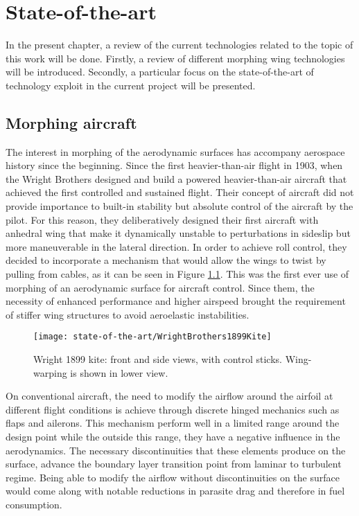 \chapter{State-of-the-art} \label{chap:State_of_the_art}

In the present chapter, a review of the current technologies related to the topic of this work will be done. Firstly, a review of different morphing wing technologies will be introduced. Secondly, a particular focus on the state-of-the-art of technology exploit in the current project will be presented.

\section{Morphing aircraft} \label{sec:Morphing_state}

  The interest in morphing of the aerodynamic surfaces has accompany aerospace history since the beginning. Since the first heavier-than-air flight in 1903, when the Wright Brothers designed and build a powered heavier-than-air aircraft that achieved the  first controlled and sustained flight. Their concept of aircraft did not provide importance to built-in stability but absolute control of the aircraft by the pilot. For this reason, they deliberatively designed their first aircraft with anhedral wing that make it dynamically unstable to perturbations in sideslip but more maneuverable in the lateral direction. In order to achieve roll control, they decided to incorporate a mechanism that would allow the wings to twist by pulling from cables, as it can be seen in Figure \ref{fig:Wright}. This was the first ever use of morphing of an aerodynamic surface for aircraft control. Since them, the necessity of enhanced performance and higher airspeed brought the requirement of stiffer wing structures to avoid aeroelastic instabilities.

  \begin{figure}[!htpb]
    \centering
    \texttt{[image: state-of-the-art/WrightBrothers1899Kite]}
    \caption[Wright Brothers 1899 kite]{Wright 1899 kite: front and side views, with control sticks. Wing-warping is shown in lower view. \cite{Wright}}\label{fig:Wright}
  \end{figure}

  On conventional aircraft, the need to modify the airflow around the airfoil at different flight conditions is achieve through discrete hinged mechanics such as flaps and ailerons. This mechanism perform well in a limited range around the design point while the outside this range, they have a negative influence in the aerodynamics. The necessary discontinuities that these elements produce on the surface, advance the boundary layer transition point from laminar to turbulent regime. Being able to modify the airflow without discontinuities on the surface would come along with notable reductions in parasite drag and therefore in fuel consumption.

